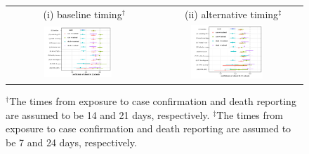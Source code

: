 \documentclass[11pt,reqno,letter]{amsart}
\theoremstyle{definition}
\begin{document}
\begin{figure}[ht]
\begin{minipage}{\linewidth}
    \medskip
    \begin{tabular}{cc}
 $\quad$  (i) baseline timing$^\dagger$ &$\quad$ (ii) alternative timing$^\ddagger$\\
      \includegraphics[width=0.5\textwidth]{tables_and_figures/pk12-whisker-14}
      &
      \includegraphics[width=0.5\textwidth]{tables_and_figures/pk12-whisker-7}
          \end{tabular}
  \end{minipage}
    \begin{flushleft}
      \footnotesize
      $^\dagger$The times from exposure to case confirmation and death reporting  are assumed to be 14 and 21 days, respectively. $^\ddagger$The times from exposure to case confirmation and death reporting  are assumed to be 7 and 24 days, respectively.
    \end{flushleft}
\end{figure}
\end{document}

